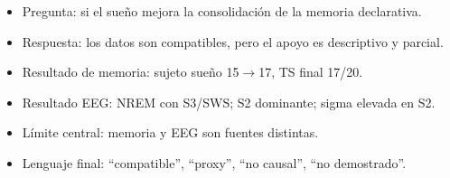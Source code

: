 \documentclass[11pt,a4paper]{article}
\begin{document}
\begin{itemize}
\item Pregunta: si el sueño mejora la consolidación de la memoria declarativa.
\item Respuesta: los datos son compatibles, pero el apoyo es descriptivo y parcial.
\item Resultado de memoria: sujeto sueño 15$\rightarrow$17, TS final 17/20.
\item Resultado EEG: NREM con S3/SWS; S2 dominante; sigma elevada en S2.
\item Límite central: memoria y EEG son fuentes distintas.
\item Lenguaje final: ``compatible'', ``proxy'', ``no causal'', ``no demostrado''.
\end{itemize}
\end{document}
